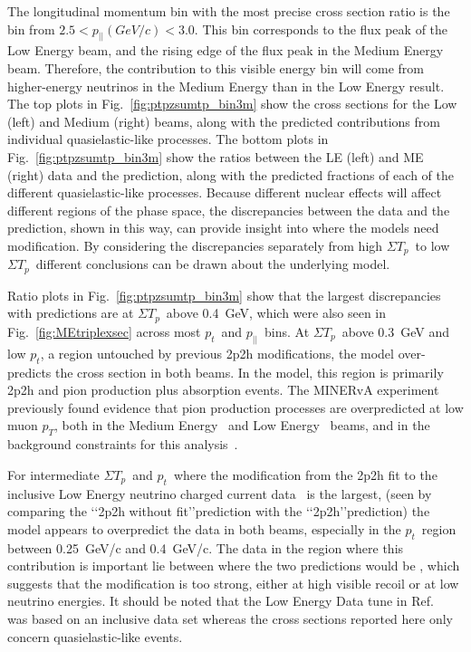 \documentclass[aps,prl,twocolumn,showpacs,superscriptaddress, floatfix,10pt]{revtex4-2}
\newcommand{\pt}{\ensuremath{p_{t}}}
\newcommand{\pz}{\ensuremath{p_{||}}}
\newcommand{\sumtp}{\ensuremath{\Sigma T_{p}}}
\newcommand{\collabAdd}[1]{{\color{black} \protect #1}}
\begin{document}
The longitudinal momentum bin with the most precise cross section ratio is the bin from $2.5<\pz (GeV/c) <3.0$.  This bin corresponds to the flux peak of the Low Energy beam, and the rising edge of the flux peak in the Medium Energy beam.  Therefore, the contribution to this visible energy bin will come from higher-energy neutrinos in the Medium Energy than in the Low Energy result.  
The top plots in Fig.~\ref{fig:ptpzsumtp_bin3m} show the cross sections for the Low (left) and Medium (right) beams, along with the predicted contributions from individual quasielastic-like processes.  The bottom plots in Fig.~\ref{fig:ptpzsumtp_bin3m}
show the ratios between the LE (left) and ME (right) data and the prediction, along with the predicted fractions of each of the different quasielastic-like processes.  Because different nuclear effects will affect different regions of the phase space, the discrepancies between the data and the prediction, shown in this way, can provide insight into where the models need modification.  By considering the discrepancies separately from high \sumtp\ to low \sumtp\, different conclusions can be drawn about the underlying model.

Ratio plots in Fig.~\ref{fig:ptpzsumtp_bin3m} show that the largest discrepancies with predictions are at \sumtp\ above 0.4~GeV, which were also seen in Fig.~\ref{fig:MEtriplexsec} across most \pt\ and \pz\ bins.  
At \sumtp\ above 0.3~GeV and low \pt , a region untouched by previous 2p2h modifications, the model over-predicts the cross section in both beams.   In the model, this region is primarily 2p2h and pion production plus absorption events.  
 \collabAdd{The MINERvA experiment previously found evidence that pion production processes are overpredicted at low muon $p_T$, both in the Medium Energy~\cite{MINERvA:2022djk} and Low Energy~\cite{MINERvA:2019kfr} beams, and in the background constraints for this analysis~\cite{MINERvA:2022mnw}.}
% 
%

 For intermediate \sumtp\ and \pt\, where the modification from the 2p2h fit to the inclusive Low Energy neutrino charged current data~\cite{Rodrigues:2015hik} is the largest, (seen by comparing the \lq\lq 2p2h without fit\rq\rq prediction with the \lq\lq 2p2h\rq\rq  prediction) the model appears to overpredict the data in both beams, especially in the \pt\ region between 0.25~GeV/c and 0.4~GeV/c.  
 The data in the region where this contribution is important lie between where the two predictions would be\collabAdd{, which suggests that the modification is too strong, either at high visible recoil or at low neutrino energies.  It should be noted that the Low Energy Data tune in Ref.~\cite{Rodrigues:2015hik} was based on an inclusive data set whereas the cross sections reported here only concern quasielastic-like events. } 
\end{document}
